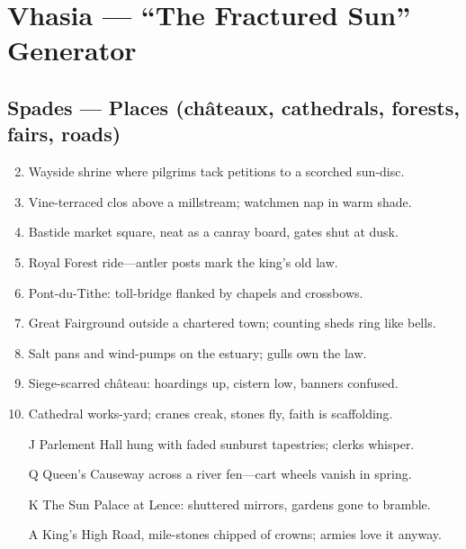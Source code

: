 \chapter{Vhasia --- ``The Fractured Sun'' Generator}

\section*{Spades --- Places (châteaux, cathedrals, forests, fairs, roads)}
\begin{enumerate}
\setcounter{enumi}{1}
\item Wayside shrine where pilgrims tack petitions to a scorched sun-disc.
\item Vine-terraced clos above a millstream; watchmen nap in warm shade.
\item Bastide market square, neat as a canray board, gates shut at dusk.
\item Royal Forest ride---antler posts mark the king's old law.
\item Pont-du-Tithe: toll-bridge flanked by chapels and crossbows.
\item Great Fairground outside a chartered town; counting sheds ring like bells.
\item Salt pans and wind-pumps on the estuary; gulls own the law.
\item Siege-scarred château: hoardings up, cistern low, banners confused.
\item Cathedral works-yard; cranes creak, stones fly, faith is scaffolding.
\item[J] Parlement Hall hung with faded sunburst tapestries; clerks whisper.
\item[Q] Queen's Causeway across a river fen---cart wheels vanish in spring.
\item[K] The Sun Palace at Lence: shuttered mirrors, gardens gone to bramble.
\item[A] King's High Road, mile-stones chipped of crowns; armies love it anyway.
\end{enumerate}

